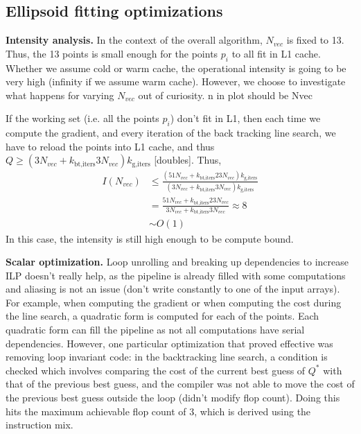 \documentclass[letterpaper]{article}
\newcommand{\mypar}[1]{{\bf #1.}}
\begin{document}
\subsection{Ellipsoid fitting optimizations} 
\mypar{Intensity analysis}  In the context of the overall algorithm, $N_{vec}$ is fixed to 13. Thus, the 13 points is small enough for the points $p_i$ to all fit in L1 cache. Whether we assume cold or warm cache, the operational intensity is going to be very high (infinity if we assume warm cache). However, we choose to investigate what happens for varying $N_{vec}$ out of curiosity. {\color{red}n in plot should be Nvec} 

If the working set (i.e. all the points $p_i$) don't fit in L1, then each time we compute the gradient, and every iteration of the back tracking line search, we have to reload the points into L1 cache, and thus $Q\geq (3N_{vec} + k_\text{bt,iters}3N_{vec})k_\text{g,iters}$ [doubles]. Thus,
\begin{align}
  I(N_{vec}) &\leq \frac{(51N_{vec} + k_\text{bt,iters}23N_{vec})k_\text{g,iters}}{(3N_{vec} + k_\text{bt,iters}3N_{vec})k_\text{g,iters}} \\
  &= \frac{51N_{vec} + k_\text{bt,iters}23N_{vec}}{3N_{vec} + k_\text{bt,iters}3N_{vec}} \approx 8 \\
  &\sim O(1)
\end{align}
In this case, the intensity is still high enough to be compute bound. 

\mypar{Scalar optimization}
Loop unrolling and breaking up dependencies to increase ILP doesn't really help, as the pipeline is already filled with some computations and aliasing is not an issue (don't write constantly to one of the input arrays). For example, when computing the gradient or when computing the cost during the line search, a quadratic form is computed for each of the points. Each quadratic form can fill the pipeline as not all computations have serial dependencies. However, one particular optimization that proved effective was removing loop invariant code: in the backtracking line search, a condition is checked which involves comparing the cost of the current best guess of $Q^*$ with that of the previous best guess, and the compiler was not able to move the cost of the previous best guess outside the loop (didn't modify flop count). Doing this hits the maximum achievable flop count of 3, which is derived using the instruction mix.
\end{document}
